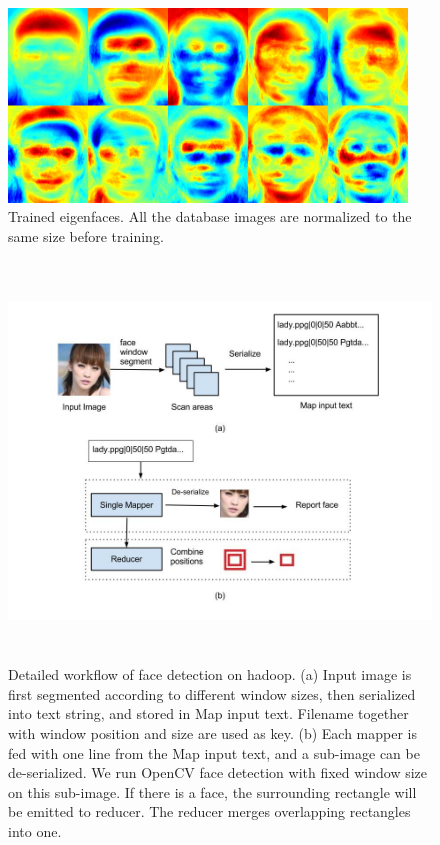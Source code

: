 \documentclass[11pt, draftclsnofoot, onecolumn]{IEEEtran}
\begin{document}
\begin{figure}
\centering
\includegraphics[width=300pt]{eigenfaces}
\caption{Trained eigenfaces. All the database images are normalized to the same size before training.}
\label{fig:eigenfaces}
\end{figure}

\begin{figure}
\centering
\includegraphics[height=300pt]{hadoop_face_detection}
\caption{Detailed workflow of face detection on hadoop. (a) Input image is first segmented according to different window sizes, then serialized into text string, and stored in Map input text. Filename together with window position and size are used as key. (b) Each mapper is fed with one line from the Map input text, and a sub-image can be de-serialized. We run OpenCV face detection with fixed window size on this sub-image. If there is a face, the surrounding rectangle will be emitted to reducer. The reducer merges overlapping rectangles into one.}
\label{fig:hadoop_face_detection}
\end{figure}
\end{document}

